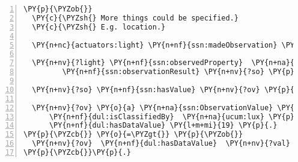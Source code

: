 \expandafter\def\csname PY@tok@err\endcsname{}
\begin{Verbatim}[commandchars=\\\{\},numbers=left,firstnumber=1,stepnumber=1]
\PY{p}{\PYZob{}}
  \PY{c}{\PYZsh{} More things could be specified.}
  \PY{c}{\PYZsh{} E.g. location.}
  
  \PY{n+nc}{actuators:light} \PY{n+nf}{ssn:madeObservation} \PY{n+nv}{?light} \PY{p}{.}
  
  \PY{n+nv}{?light} \PY{n+nf}{ssn:observedProperty}  \PY{n+na}{sweet:Light} \PY{p}{;}
         \PY{n+nf}{ssn:observationResult} \PY{n+nv}{?so} \PY{p}{.}
  
  \PY{n+nv}{?so} \PY{n+nf}{ssn:hasValue} \PY{n+nv}{?ov} \PY{p}{.}
  
  \PY{n+nv}{?ov} \PY{o}{a} \PY{n+na}{ssn:ObservationValue} \PY{p}{;}
      \PY{n+nf}{dul:isClassifiedBy}  \PY{n+na}{ucum:lux} \PY{p}{;}
      \PY{n+nf}{dul:hasDataValue} \PY{l+m+mi}{19} \PY{p}{.}
\PY{p}{\PYZcb{}} \PY{o}{=\PYZgt{}} \PY{p}{\PYZob{}}
  \PY{n+nv}{?ov}  \PY{n+nf}{dul:hasDataValue}  \PY{n+nv}{?val} \PY{p}{.}
\PY{p}{\PYZcb{}}\PY{p}{.}
\end{Verbatim}
